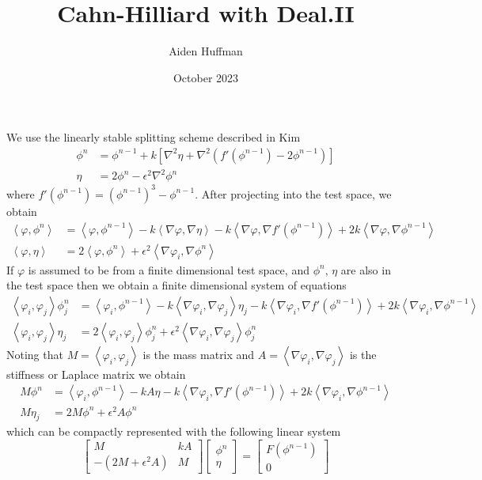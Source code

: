 \documentclass{article}
\title{Cahn-Hilliard with Deal.II}
\author{Aiden Huffman}
\date{October 2023}
\newcommand\ang[1]{\left\langle #1 \right\rangle}
\begin{document}
\maketitle

We use the linearly stable splitting scheme described in Kim
\begin{align}
    \phi^n &= \phi^{n-1} + k \left[\nabla^2 \eta + \nabla^2 \left(f'(\phi^{n-1}) - 2\phi^{n-1}\right)\right]\\
    \eta &= 2\phi^n - \epsilon^2 \nabla^2\phi^n
\end{align}
where $f'(\phi^{n-1}) = (\phi^{n-1})^3 - \phi^{n-1}$.
After projecting into the test space, we obtain
\begin{align}
    \ang{\varphi, \phi^n} &= \ang{\varphi,\phi^{n-1}} - k \ang{\nabla\varphi, \nabla\eta} - k\ang{\nabla \varphi, \nabla f'(\phi^{n-1})} + 2k\ang{\nabla \varphi, \nabla \phi^{n-1}}\\
    \ang{\varphi, \eta} &= 2\ang{\varphi,\phi^n} + \epsilon^2 \ang{\nabla\varphi_i, \nabla\phi^n}
\end{align}
If $\varphi$ is assumed to be from a finite dimensional test space, and $\phi^n,\, \eta$ are also in the test space then we obtain a finite dimensional system of equations
\begin{align}
    \ang{\varphi_i, \varphi_j}\phi^n_j &= \ang{\varphi_i,\phi^{n-1}} - k \ang{\nabla\varphi_i, \nabla\varphi_j}\eta_j - k\ang{\nabla \varphi_i,\nabla f'(\phi^{n-1})} + 2k\ang{\nabla \varphi_i, \nabla \phi^{n-1}}\\
    \ang{\varphi_i, \varphi_j}\eta_j &= 2\ang{\varphi_i,\varphi_j}\phi^n_j + \epsilon^2 \ang{\nabla\varphi_i, \nabla\varphi_j}\phi^n_j
\end{align}
Noting that $M = \ang{\varphi_i, \varphi_j}$ is the mass matrix and $A = \ang{\nabla\varphi_i, \nabla\varphi_j}$ is the stiffness or Laplace matrix we obtain
\begin{align}
    M\phi^n &= \ang{\varphi_i,\phi^{n-1}} - k A\eta - k\ang{\nabla \varphi_i,\nabla f'(\phi^{n-1})} + 2k\ang{\nabla \varphi_i, \nabla \phi^{n-1}}\\
    M\eta_j &= 2M\phi^n + \epsilon^2 A\phi^n
\end{align}
which can be compactly represented with the following linear system
\begin{equation}
    \begin{bmatrix}
        M & kA\\
        -(2M + \epsilon^2 A) & M
    \end{bmatrix}\begin{bmatrix}
        \phi^n\\
        \eta
    \end{bmatrix} = \begin{bmatrix}
        F(\phi^{n-1})\\
        0
    \end{bmatrix}
\end{equation}
\end{document}
